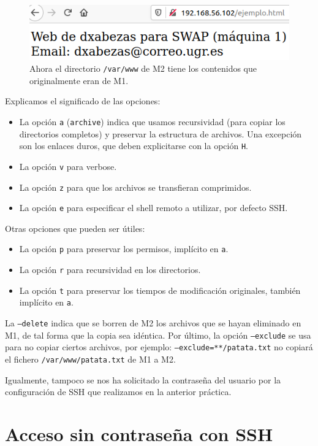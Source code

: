 \documentclass{article}
\begin{document}
\begin{figure}[H]
	\centering
	\includegraphics[width=130mm]{imgs/rsync-example}
	\caption{Ahora el directorio \texttt{/var/www} de M2 tiene los contenidos que originalmente eran de M1.}
	\label{fig:rsync-example}
\end{figure}

Explicamos el significado de las opciones:
\begin{itemize}
	\item La opción \texttt{a} (\texttt{archive}) indica que usamos recursividad (para copiar los directorios completos) y preservar la estructura de archivos.
	Una excepción son los enlaces duros, que deben explicitarse con la opción \texttt{H}.
	\item La opción \texttt{v} para verbose.
	\item La opción \texttt{z} para que los archivos se transfieran comprimidos.
	\item La opción \texttt{e} para especificar el shell remoto a utilizar, por defecto SSH.
\end{itemize}

Otras opciones que pueden ser útiles:
\begin{itemize}
	\item La opción \texttt{p} para preservar los permisos, implícito en \texttt{a}.
	\item La opción \texttt{r} para recursividad en los directorios.
	\item La opción \texttt{t} para preservar los tiempos de modificación originales, también implícito en \texttt{a}.
\end{itemize}

La \texttt{--delete} indica que se borren de M2 los archivos que se hayan eliminado en M1, de tal forma que la copia sea idéntica.
Por último, la opción \texttt{--exclude} se usa para no copiar ciertos archivos, por ejemplo: \texttt{--exclude=**/patata.txt} no copiará
el fichero \texttt{/var/www/patata.txt} de M1 a M2.

Igualmente, tampoco se nos ha solicitado la contraseña del usuario por la configuración de SSH que realizamos en la anterior práctica.

\section{Acceso sin contraseña con SSH}
\end{document}
